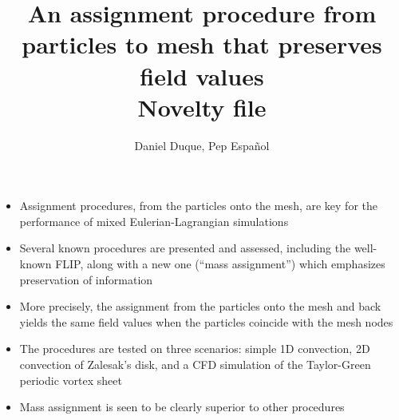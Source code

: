 \documentclass[number]{fldauth}
\begin{document}
\title{%
  An assignment procedure from particles to mesh that preserves
  field values
  \\
  Novelty file
}


\author{Daniel Duque\footnotemark[1] ,  Pep Espa\~nol \footnotemark[2]}
\address{%
  \footnotemark[1]
  Model Basin Research Group (CEHINAV).
  ETSI Navales, Universidad Polit\'ecnica de Madrid.
  Madrid, Spain
  \\
  \footnotemark[2]
  Dpto. de F{\'\i}sica Fundamental.
  Universidad Nacional de Educaci\'on a Distancia.
  Madrid, Spain}



\maketitle

\begin{itemize}

\item Assignment procedures, from the particles onto the mesh, are key
  for the performance of mixed Eulerian-Lagrangian simulations

\item Several known procedures are presented and assessed, including
  the well-known FLIP, along with a new one (``mass assignment'')
  which emphasizes preservation of information

\item More precisely, the assignment from the particles onto the mesh
  and back yields the same field values when the particles coincide
  with the mesh nodes

\item The procedures are tested on three scenarios: simple 1D
  convection, 2D convection of Zalesak's disk, and a CFD simulation of
  the Taylor-Green periodic vortex sheet

\item Mass assignment is seen to be clearly superior to other procedures

\end{itemize}
\end{document}
